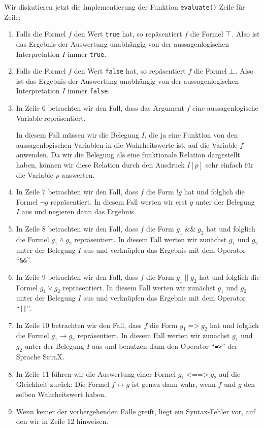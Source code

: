 \noindent
Wir diskutieren jetzt die Implementierung der Funktion \texttt{evaluate()} Zeile f\"{u}r
Zeile:
\begin{enumerate}
\item Falls die Formel $f$ den Wert \texttt{true} hat, so rep\"{a}sentiert $f$ die Formel $\top$.
      Also ist das Ergebnis der Auswertung unabh\"{a}ngig von der aussagenlogischen
      Interpretation $I$ immer \texttt{true}. 
\item Falls die Formel $f$ den Wert \texttt{false} hat, so rep\"{a}sentiert $f$ die Formel
      $\bot$.  Also ist das Ergebnis der
      Auswertung unabh\"{a}ngig von der aussagenlogischen Interpretation $I$ immer \texttt{false}.
\item In Zeile 6 betrachten wir den Fall, dass das Argument $f$ eine aussagenlogische
      Variable repr\"{a}sentiert.   

      In diesem Fall m\"{u}ssen wir die Belegung $I$, die ja eine Funktion
      von den aussagenlogischen Variablen in die Wahrheitswerte ist, auf die Variable $f$
      anwenden.  Da wir die Belegung als eine funktionale Relation dargestellt haben,
      k\"{o}nnen wir diese Relation durch den Ausdruck $I[p]$ sehr einfach f\"{u}r die Variable 
      $p$ auswerten.
\item In Zeile 7 betrachten wir den Fall, dass $f$ die Form $\texttt{!}g$
      hat und folglich die Formel $\neg g$ repr\"{a}sentiert.
      In diesem Fall werten wir erst $g$ unter der Belegung $I$ aus und negieren dann das Ergebnis.
\item In Zeile 8 betrachten wir den Fall, dass $f$ die Form 
      $g_1 \;\texttt{\&\&}\; g_2$ hat und folglich die 
      Formel $g_1 \wedge g_2$ repr\"{a}sentiert.
      In diesem Fall werten wir zun\"{a}chst $g_1$ und $g_2$ unter der Belegung $I$ 
      aus und verkn\"{u}pfen  das Ergebnis mit dem Operator ``\texttt{\&\&}''.
\item In Zeile 9 betrachten wir den Fall, dass $f$ die Form 
      $g_1 \;\texttt{||}\; g_2$ hat und folglich die Formel $g_1 \vee g_2$ repr\"{a}sentiert.
      In diesem Fall werten wir zun\"{a}chst $g_1$ und $g_2$ unter der Belegung $I$ 
      aus und verkn\"{u}pfen  das Ergebnis mit dem Operator ``\texttt{||}''.
\item In Zeile 10 betrachten wir den Fall, dass $f$ die Form 
       $g_1 \;\texttt{=>}\; g_2$ hat und folglich die 
      Formel $g_1 \rightarrow g_2$       repr\"{a}sentiert.
      In diesem Fall werten wir zun\"{a}chst $g_1$ und $g_2$ unter der Belegung $I$ 
      aus und benutzen dann den Operator ``\texttt{=>}'' der Sprache \textsc{SetlX}.
\item In Zeile 11 f\"{u}hren wir die Auswertung einer Formel $g_1 \;\texttt{<==>}\; g_2$
      auf die Gleichheit zur\"{u}ck: Die Formel $f \leftrightarrow g$ ist genau dann wahr,
      wenn $f$ und $g$ den selben Wahrheitswert haben.
\item Wenn keiner der vorhergehenden F\"{a}lle greift, liegt ein Syntax-Fehler vor, 
      auf den wir in Zeile 12 hinweisen.
\end{enumerate}



